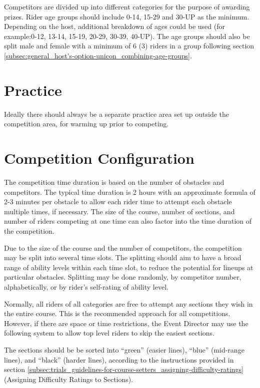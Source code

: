 Competitors are divided up into different categories for the purpose of awarding prizes.
Rider age groups should include 0-14, 15-29 and 30-UP as the minimum.
Depending on the host, additional breakdown of ages could be used (for example:0-12, 13-14, 15-19, 20-29, 30-39, 40-UP).
The age groups should also be split male and female with a minimum of 6 (3) riders in a group following section \ref{subsec:general_host's-option-unicon_combining-age-groups}.

\section{Practice}

Ideally there should always be a separate practice area set up outside the competition area, for warming up prior to competing.

\section{Competition Configuration}

The competition time duration is based on the number of obstacles and competitors.
The typical time duration is 2 hours with an approximate formula of 2-3 minutes per obstacle to allow each rider time to attempt each obstacle multiple times, if necessary.
The size of the course, number of sections, and number of riders competing at one time can also factor into the time duration of the competition.

Due to the size of the course and the number of competitors, the competition may be split into several time slots.
The splitting should aim to have a broad range of ability levels within each time slot, to reduce the potential for lineups at particular obstacles.
Splitting may be done randomly, by competitor number, alphabetically, or by rider's self-rating of ability level.

\label{sec:trials_section-restrictions-for-competition-categories}
Normally, all riders of all categories are free to attempt any sections they wish in the entire course.
This is the recommended approach for all competitions.
However, if there are space or time restrictions, the Event Director may use the following system to allow top level riders to skip the easiest sections.

The sections should be be sorted into ``green'' (easier lines), ``blue'' (mid-range lines), and ``black'' (harder lines), according to the instructions provided in section \ref{subsec:trials_guidelines-for-course-setters_assigning-difficulty-ratings} (Assigning Difficulty Ratings to Sections).

